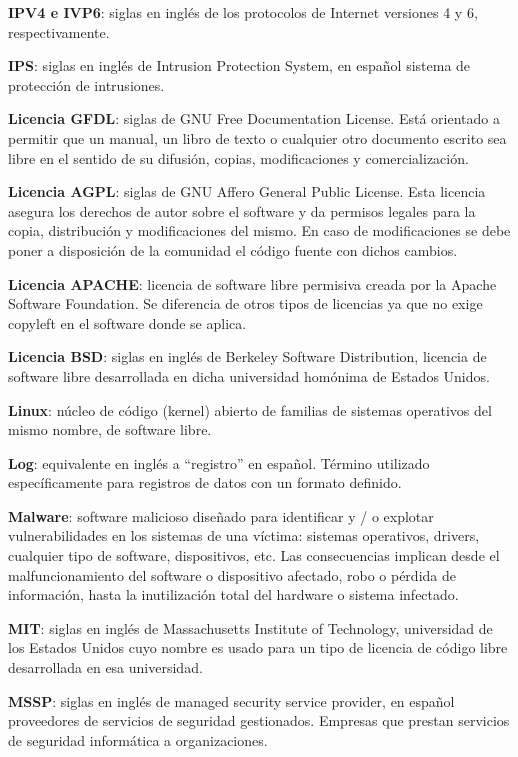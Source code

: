 \textbf{IPV4 e IVP6}: siglas en inglés de los protocolos de Internet versiones 4 y 6, respectivamente. \par

\textbf{IPS}: siglas en inglés de Intrusion Protection System, en español sistema de protección de intrusiones. \par
\textbf{}
\textbf{Licencia GFDL}: siglas de GNU Free Documentation License. Está orientado a permitir que un manual, un libro de texto o cualquier  otro documento escrito sea libre en el sentido de su difusión, copias, modificaciones y comercialización. \par

\textbf{Licencia AGPL}: siglas de GNU Affero General Public License. Esta licencia asegura los derechos de autor sobre el software y da permisos legales para la copia, distribución y modificaciones del mismo. En caso de modificaciones se debe poner a disposición de la comunidad el código fuente con dichos cambios. \par

\textbf{Licencia APACHE}: licencia de software libre permisiva creada por la Apache Software Foundation. Se diferencia de otros tipos de licencias ya que no exige copyleft en el software donde se aplica. \par

\textbf{Licencia BSD}: siglas en inglés de Berkeley Software Distribution, licencia de software libre desarrollada en dicha universidad homónima de Estados Unidos. \par

\textbf{Linux}: núcleo de código (kernel) abierto de familias de sistemas operativos del mismo nombre, de software libre. \par

\textbf{Log}: equivalente en inglés a “registro” en español. Término utilizado específicamente para registros de datos con un formato definido. \par

\textbf{Malware}: software malicioso diseñado para identificar y / o explotar vulnerabilidades en  los sistemas de  una víctima: sistemas operativos, drivers, cualquier tipo de software, dispositivos, etc. Las consecuencias implican desde el malfuncionamiento del software o dispositivo afectado, robo o pérdida de información, hasta la inutilización total del hardware o sistema infectado. \par

\textbf{MIT}: siglas en inglés de Massachusetts Institute of Technology, universidad de los Estados Unidos cuyo nombre es usado para un tipo de licencia de código libre desarrollada en esa universidad. \par
\textbf{MSSP}: siglas 
en inglés de managed security service provider, en español proveedores de servicios de seguridad gestionados. Empresas que prestan servicios de seguridad informática a organizaciones. \par

